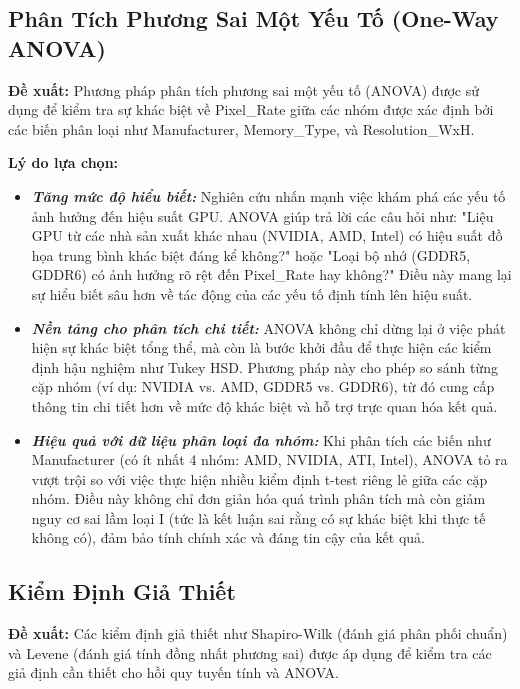 \subsection{Phân Tích Phương Sai Một Yếu Tố (One-Way ANOVA)}

\textbf{Đề xuất:} Phương pháp phân tích phương sai một yếu tố (ANOVA) được sử dụng để kiểm tra sự khác biệt về Pixel\_Rate giữa các nhóm được xác định bởi các biến phân loại như Manufacturer, Memory\_Type, và Resolution\_WxH.

\textbf{Lý do lựa chọn:}

\begin{itemize}
    \item \textbf{\textit{Tăng mức độ hiểu biết:}} Nghiên cứu nhấn mạnh việc khám phá các yếu tố ảnh hưởng đến hiệu suất GPU. ANOVA giúp trả lời các câu hỏi như: "Liệu GPU từ các nhà sản xuất khác nhau (NVIDIA, AMD, Intel) có hiệu suất đồ họa trung bình khác biệt đáng kể không?" hoặc "Loại bộ nhớ (GDDR5, GDDR6) có ảnh hưởng rõ rệt đến Pixel\_Rate hay không?" Điều này mang lại sự hiểu biết sâu hơn về tác động của các yếu tố định tính lên hiệu suất.
    \item \textbf{\textit{Nền tảng cho phân tích chi tiết:}} ANOVA không chỉ dừng lại ở việc phát hiện sự khác biệt tổng thể, mà còn là bước khởi đầu để thực hiện các kiểm định hậu nghiệm như Tukey HSD. Phương pháp này cho phép so sánh từng cặp nhóm (ví dụ: NVIDIA vs. AMD, GDDR5 vs. GDDR6), từ đó cung cấp thông tin chi tiết hơn về mức độ khác biệt và hỗ trợ trực quan hóa kết quả.
    \item \textbf{\textit{Hiệu quả với dữ liệu phân loại đa nhóm:}} Khi phân tích các biến như Manufacturer (có ít nhất 4 nhóm: AMD, NVIDIA, ATI, Intel), ANOVA tỏ ra vượt trội so với việc thực hiện nhiều kiểm định t-test riêng lẻ giữa các cặp nhóm. Điều này không chỉ đơn giản hóa quá trình phân tích mà còn giảm nguy cơ sai lầm loại I (tức là kết luận sai rằng có sự khác biệt khi thực tế không có), đảm bảo tính chính xác và đáng tin cậy của kết quả.
\end{itemize}



\subsection{Kiểm Định Giả Thiết}

\textbf{Đề xuất:} Các kiểm định giả thiết như Shapiro-Wilk (đánh giá phân phối chuẩn) và Levene (đánh giá tính đồng nhất phương sai) được áp dụng để kiểm tra các giả định cần thiết cho hồi quy tuyến tính và ANOVA.

